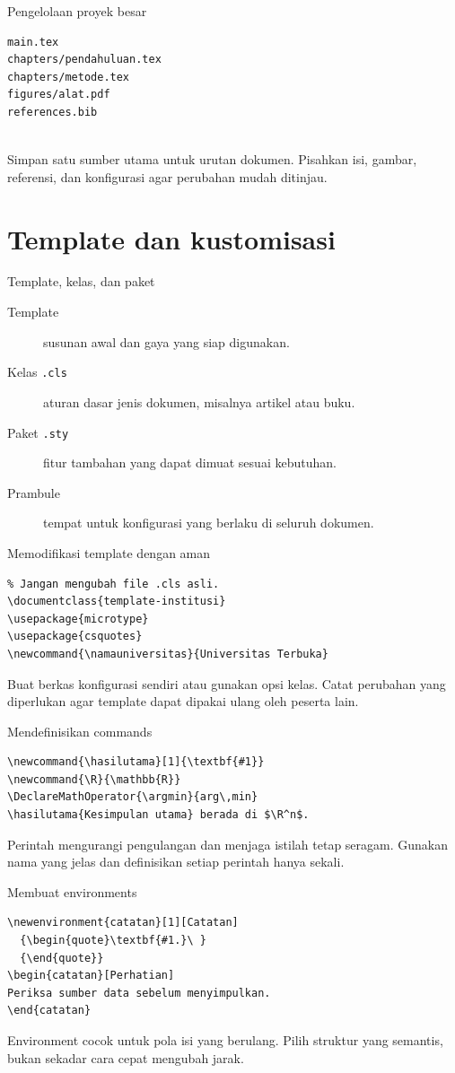 \documentclass[aspectratio=169,11pt]{beamer}
\begin{document}
\begin{frame}[fragile]{Pengelolaan proyek besar}
\begin{lstlisting}
main.tex
chapters/pendahuluan.tex
chapters/metode.tex
figures/alat.pdf
references.bib


\end{lstlisting}
Simpan satu sumber utama untuk urutan dokumen. Pisahkan isi, gambar,
referensi, dan konfigurasi agar perubahan mudah ditinjau.
\end{frame}
\section{Template dan kustomisasi}
\begin{frame}{Template, kelas, dan paket}
\begin{description}
\item[Template] susunan awal dan gaya yang siap digunakan.
\item[Kelas \texttt{.cls}] aturan dasar jenis dokumen, misalnya artikel atau buku.
\item[Paket \texttt{.sty}] fitur tambahan yang dapat dimuat sesuai kebutuhan.
\item[Prambule] tempat untuk konfigurasi yang berlaku di seluruh dokumen.
\end{description}
\end{frame}
\begin{frame}[fragile]{Memodifikasi template dengan aman}
\begin{lstlisting}
% Jangan mengubah file .cls asli.
\documentclass{template-institusi}
\usepackage{microtype}
\usepackage{csquotes}
\newcommand{\namauniversitas}{Universitas Terbuka}
\end{lstlisting}
Buat berkas konfigurasi sendiri atau gunakan opsi kelas. Catat perubahan
yang diperlukan agar template dapat dipakai ulang oleh peserta lain.
\end{frame}
\begin{frame}[fragile]{Mendefinisikan commands}
\begin{lstlisting}
\newcommand{\hasilutama}[1]{\textbf{#1}}
\newcommand{\R}{\mathbb{R}}
\DeclareMathOperator{\argmin}{arg\,min}
\hasilutama{Kesimpulan utama} berada di $\R^n$.
\end{lstlisting}
Perintah mengurangi pengulangan dan menjaga istilah tetap seragam.
Gunakan nama yang jelas dan definisikan setiap perintah hanya sekali.
\end{frame}
\begin{frame}[fragile]{Membuat environments}
\begin{lstlisting}
\newenvironment{catatan}[1][Catatan]
  {\begin{quote}\textbf{#1.}\ }
  {\end{quote}}
\begin{catatan}[Perhatian]
Periksa sumber data sebelum menyimpulkan.
\end{catatan}
\end{lstlisting}
Environment cocok untuk pola isi yang berulang. Pilih struktur yang
semantis, bukan sekadar cara cepat mengubah jarak.
\end{frame}
\end{document}
